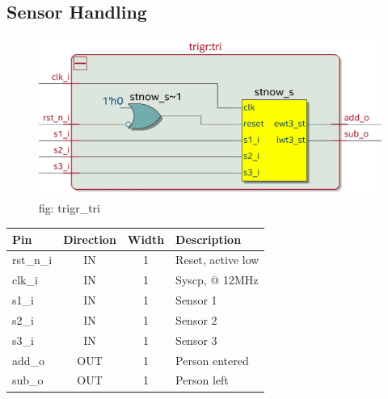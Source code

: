 \documentclass[12pt,a4 paper] {report}
\begin{document}
\subsection{Sensor Handling}
\begin{figure}[h]
	\centering	
	\includegraphics[scale=0.2]{../png/trigr_tri.png}
	\newline
	fig: trigr\_tri \\
\end{figure}
\begin{center}
	\begin{tabular}{ | p{2cm} | c | c | p{5cm} |}
		\hline
		\textbf{Pin} & \textbf{Direction} & \textbf{Width} & \textbf{Description} \\
		\hline	
		rst\_n\_i & IN & 1 & Reset, active low \\
		\hline
		clk\_i & IN & 1 & Syscp, @ 12MHz \\
		\hline
		s1\_i & IN & 1 & Sensor 1 \\
		\hline
		s2\_i & IN & 1 & Sensor 2 \\
		\hline
		s3\_i & IN & 1 & Sensor 3 \\
		\hline
		add\_o & OUT & 1 & Person entered \\
		\hline
		sub\_o & OUT & 1 & Person left \\
		\hline
	\end{tabular}
\end{center}
\newpage
\end{document}
